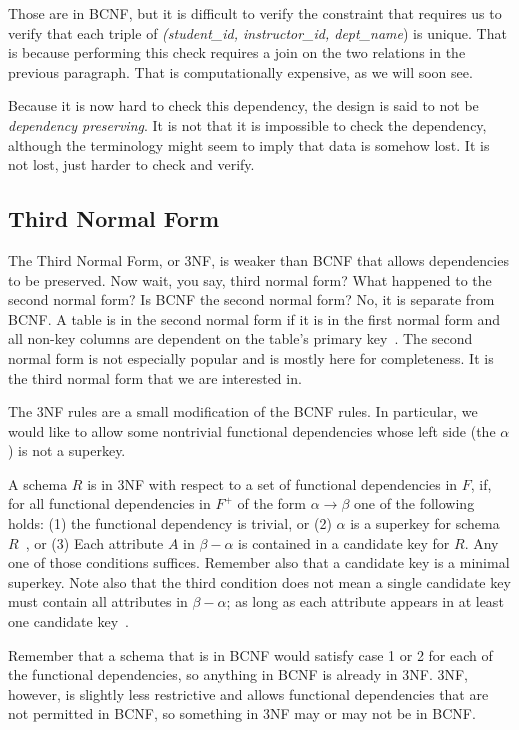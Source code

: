 \documentclass[a4paper]{report}
\begin{document}
Those are in BCNF, but it is difficult to verify the constraint that requires us to verify that each triple of \textit{(student\_id, instructor\_id, dept\_name}) is unique. That is because performing this check requires a join on the two relations in the previous paragraph. That is computationally expensive, as we will soon see. 

Because it is now hard to check this dependency, the design is said to not be \textit{dependency preserving}. It is not that it is impossible to check the dependency, although the terminology might seem to imply that data is somehow lost. It is not lost, just harder to check and verify.

\subsection*{Third Normal Form}
The Third Normal Form, or 3NF, is weaker than BCNF that allows dependencies to be preserved. Now wait, you say, third normal form? What happened to the second normal form? Is BCNF the second normal form? No, it is separate from BCNF. A table is in the second normal form if it is in the first normal form and all non-key columns are dependent on the table's primary key~\cite{secnorm}. The second normal form is not especially popular and is mostly here for completeness. It is the third normal form that we are interested in. 
 
The 3NF rules are a small modification of the BCNF rules. In particular, we would like to allow some nontrivial functional dependencies whose left side (the $\alpha$) is not a superkey. 

A schema $R$ is in 3NF with respect to a set of functional dependencies in $F$, if, for all functional dependencies in $F^{+}$ of the form $\alpha \rightarrow \beta$ one of the following holds: (1) the functional dependency is trivial, or (2) $\alpha$ is a superkey for schema $R$~\cite{dsc}, or (3) Each attribute $A$ in $\beta - \alpha$ is contained in a candidate key for $R$. Any one of those conditions suffices. Remember also that a candidate key is a minimal superkey. Note also that the third condition does not mean a single candidate key must contain all attributes in $\beta - \alpha$; as long as each attribute appears in at least one candidate key~\cite{dsc}.

Remember that a schema that is in BCNF would satisfy case 1 or 2 for each of the functional dependencies, so anything in BCNF is already in 3NF. 3NF, however, is slightly less restrictive and allows functional dependencies that are not permitted in BCNF, so something in 3NF may or may not be in BCNF.
\end{document}
